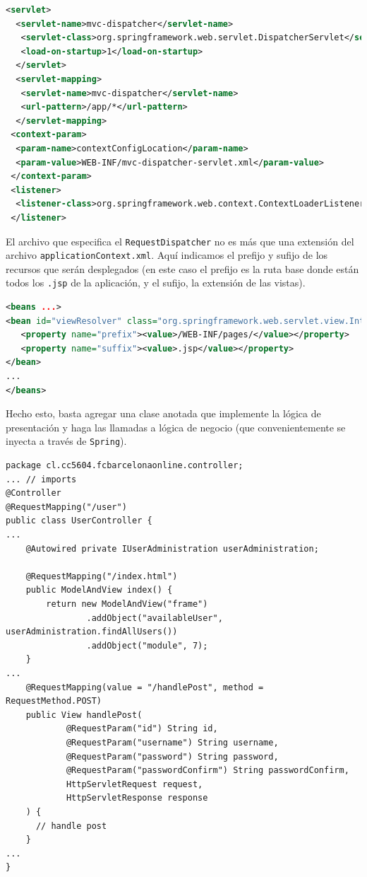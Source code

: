 \documentclass[letter]{article}
\begin{document}
\begin{lstlisting}[language=xml]
 <servlet>
  <servlet-name>mvc-dispatcher</servlet-name>
   <servlet-class>org.springframework.web.servlet.DispatcherServlet</servlet-class>
   <load-on-startup>1</load-on-startup>
  </servlet>
  <servlet-mapping>
   <servlet-name>mvc-dispatcher</servlet-name>
   <url-pattern>/app/*</url-pattern>
  </servlet-mapping>
 <context-param>
  <param-name>contextConfigLocation</param-name>
  <param-value>WEB-INF/mvc-dispatcher-servlet.xml</param-value>
 </context-param>
 <listener>
  <listener-class>org.springframework.web.context.ContextLoaderListener</listener-class>
 </listener>
\end{lstlisting}
El archivo que especifica el \texttt{RequestDispatcher} no es más que una extensión del archivo \texttt{applicationContext.xml}. Aquí indicamos el prefijo y sufijo de los recursos que serán desplegados (en este caso el prefijo es la ruta base donde están todos los \texttt{.jsp} de la aplicación, y el sufijo, la extensión de las vistas).
\begin{lstlisting}[language=xml]
<beans ...>
<bean id="viewResolver" class="org.springframework.web.servlet.view.InternalResourceViewResolver">
   <property name="prefix"><value>/WEB-INF/pages/</value></property>
   <property name="suffix"><value>.jsp</value></property>
</bean>
...
</beans>
\end{lstlisting}

Hecho esto, basta agregar una clase anotada que implemente la lógica de presentación y haga las llamadas a lógica de negocio (que convenientemente se inyecta a través de \texttt{Spring}).

\begin{lstlisting}
package cl.cc5604.fcbarcelonaonline.controller;
... // imports
@Controller
@RequestMapping("/user")
public class UserController {
...
    @Autowired private IUserAdministration userAdministration;

    @RequestMapping("/index.html")
    public ModelAndView index() {
        return new ModelAndView("frame")
                .addObject("availableUser", userAdministration.findAllUsers())
                .addObject("module", 7);
    }
...
    @RequestMapping(value = "/handlePost", method = RequestMethod.POST)
    public View handlePost(
            @RequestParam("id") String id,
            @RequestParam("username") String username,
            @RequestParam("password") String password,
            @RequestParam("passwordConfirm") String passwordConfirm,
            HttpServletRequest request,
            HttpServletResponse response
    ) {
      // handle post
    }
...
}
\end{lstlisting}
\end{document}
